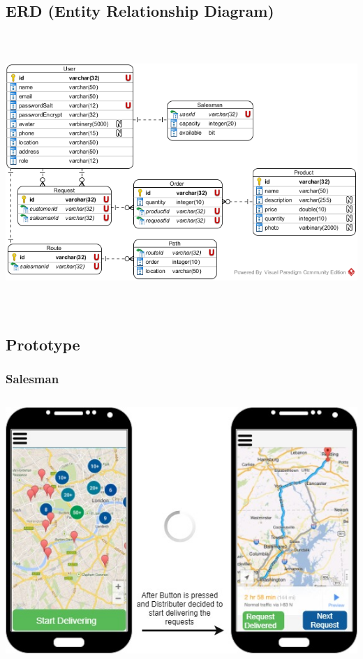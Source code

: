 \documentclass[12pt]{article}
\begin{document}
\subsection{ ERD (Entity Relationship Diagram) }

\includegraphics[width=17cm,height=10.5cm]{./assets/erd.png}


\subsection{ Prototype }

\subsubsection{ Salesman }
\includegraphics[width=16cm,height=10cm]{./assets/prototype/distributer-1.png}\\
\end{document}
